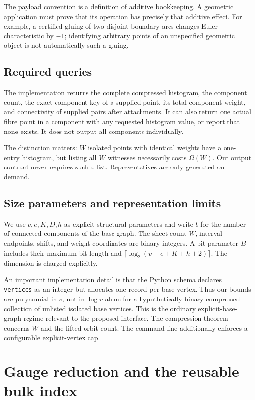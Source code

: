 \documentclass[11pt]{article}
\theoremstyle{definition}
\newcommand{\code}[1]{\texttt{#1}}
\begin{document}
The payload convention is a definition of additive bookkeeping. A geometric application must prove that its operation has precisely that additive effect. For example, a certified gluing of two disjoint boundary arcs changes Euler characteristic by $-1$; identifying arbitrary points of an unspecified geometric object is not automatically such a gluing.

\subsection{Required queries}
The implementation returns the complete compressed histogram, the component count, the exact component key of a supplied point, its total component weight, and connectivity of supplied pairs after attachments. It can also return one actual fibre point in a component with any requested histogram value, or report that none exists. It does not output all components individually.

The distinction matters: $W$ isolated points with identical weights have a one-entry histogram, but listing all $W$ witnesses necessarily costs $\Omega(W)$. Our output contract never requires such a list. Representatives are only generated on demand.

\subsection{Size parameters and representation limits}
We use $v,e,K,D,h$ as explicit structural parameters and write $b$ for the number of connected components of the base graph. The sheet count $W$, interval endpoints, shifts, and weight coordinates are binary integers. A bit parameter $B$ includes their maximum bit length and $\lceil\log_2(v+e+K+h+2)\rceil$. The dimension is charged explicitly.

An important implementation detail is that the Python schema declares \code{vertices} as an integer but allocates one record per base vertex. Thus our bounds are polynomial in $v$, not in $\log v$ alone for a hypothetically binary-compressed collection of unlisted isolated base vertices. This is the ordinary explicit-base-graph regime relevant to the proposed interface. The compression theorem concerns $W$ and the lifted orbit count. The command line additionally enforces a configurable explicit-vertex cap.

\section{Gauge reduction and the reusable bulk index}
\label{sec:gauge}
\end{document}
